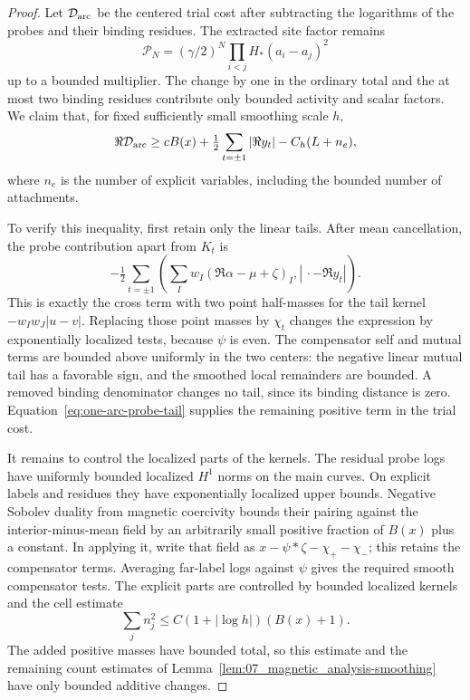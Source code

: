 \begin{proof}
Let $\mathcal D_{\rm arc}$ be the centered trial cost after subtracting
the logarithms of the probes and their binding residues.  The extracted
site factor remains
\[
       \mathcal P_N=(\gamma/2)^N\prod_{i<j}H_*(a_i-a_j)^2
\]
up to a bounded multiplier.  The change by one in the ordinary total
and the at most two binding residues contribute only bounded activity
and scalar factors.  We claim that, for fixed sufficiently small
smoothing scale $h$,
\begin{equation}
 \Re\mathcal D_{\rm arc}
 \ge cB(x)+\tfrac12\sum_{t=\pm1}|\Re y_t|
                  -C_h(L+n_e),
\label{eq:09-trial}
\end{equation}
where $n_e$ is the number of explicit variables, including the
bounded number of attachments.

To verify this inequality, first retain only the linear tails.  After
mean cancellation, the probe contribution apart from $K_t$ is
\[
 -\tfrac12\sum_{t=\pm1}
 \left(\sum_Iw_I(\Re\alpha-\mu+\zeta)_I,
                              |\,\cdot-\Re y_t|\right).
\]
This is exactly the cross term with two point half-masses for the tail
kernel $-w_Iw_J|u-v|$.  Replacing those point masses by $\chi_t$
changes the expression by exponentially localized tests, because
$\psi$ is even.  The compensator self and mutual terms are bounded
above uniformly in the two centers: the negative linear mutual tail
has a favorable sign, and the smoothed local remainders are bounded.
A removed binding denominator changes no tail, since its binding
distance is zero.  Equation~\eqref{eq:one-arc-probe-tail} supplies
the remaining positive term in the trial cost.

It remains to control the localized parts of the kernels.  The residual
probe logs have uniformly bounded localized $H^1$ norms on the main
curves.  On explicit labels and residues they have exponentially
localized upper bounds.  Negative Sobolev duality from magnetic
coercivity bounds their pairing against the interior-minus-mean field
by an arbitrarily small positive fraction of $B(x)$ plus a constant.
In applying it, write that field as
$x-\psi*\zeta-\chi_+-\chi_-$; this retains the compensator terms.
Averaging far-label logs against $\psi$ gives the required smooth
compensator tests.  The explicit parts are controlled by bounded
localized kernels and the cell estimate
\[
 \sum_j n_j^2\le C(1+|\log h|)(B(x)+1).
\]
The added positive masses have bounded total, so this estimate and
the remaining count estimates of
Lemma~\ref{lem:07_magnetic_analysis-smoothing} have only bounded
additive changes.


\end{proof}
